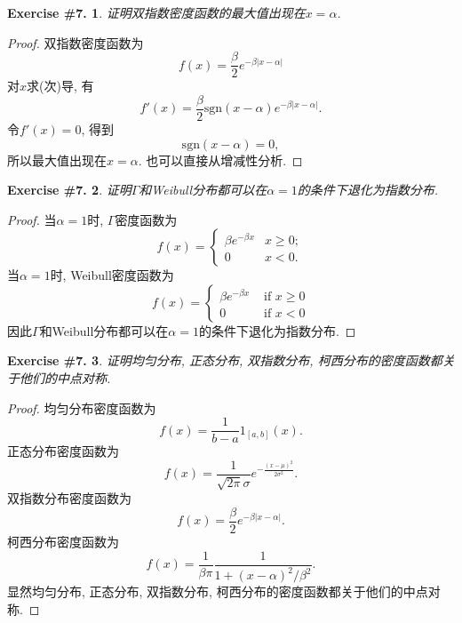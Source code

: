 \documentclass[UTF8, a4paper]{article}
\newtheorem{exercise}{Exercise \#7.}
\begin{document}
\begin{framed}
\begin{exercise}
证明双指数密度函数的最大值出现在$x = \alpha$.
\end{exercise}
\end{framed}

\begin{proof}
双指数密度函数为
$$
f(x)=\frac{\beta}{2} e^{-\beta|x-\alpha|}
$$
对\(x\)求(次)导, 有
$$
f'(x) = \frac{\beta}{2} \text{sgn}(x - \alpha)e^{-\beta|x-\alpha|}.
$$
令\(f'(x) = 0\), 得到
$$
\text{sgn}(x - \alpha) = 0,
$$
所以最大值出现在\(x = \alpha\). 也可以直接从增减性分析.

\end{proof}


\begin{framed}
\begin{exercise}
证明$\Gamma$和Weibull分布都可以在$\alpha = 1$的条件下退化为指数分布.
\end{exercise}
\end{framed}

\begin{proof}
当\(\alpha = 1\)时, \(\Gamma\)密度函数为
$$
f(x)= \begin{cases}\beta e^{-\beta x} & x \geq 0; \\ 0 & x<0.\end{cases}
$$
当\(\alpha = 1\)时, Weibull密度函数为
$$
f(x)= \begin{cases}\beta e^{-\beta x} & \text { if } x \geq 0 \\ 0 & \text { if } x<0\end{cases}
$$
因此\(\Gamma\)和Weibull分布都可以在\(\alpha = 1\)的条件下退化为指数分布.
\end{proof}


\begin{framed}
\begin{exercise}
证明均匀分布, 正态分布, 双指数分布, 柯西分布的密度函数都关于他们的中点对称.
\end{exercise}
\end{framed}

\begin{proof}
均匀分布密度函数为
$$
f(x)=\frac{1}{b-a} 1_{[a, b]}(x).
$$
正态分布密度函数为
$$
f(x) = \frac{1}{\sqrt{2\pi}\sigma}e^{-\frac{(x - \mu)^2}{2\sigma^2}}.
$$
双指数分布密度函数为
$$
f(x)=\frac{\beta}{2} e^{-\beta|x-\alpha|}.
$$
柯西分布密度函数为
$$
f(x)=\frac{1}{\beta\pi} \frac{1}{1+(x - \alpha)^2/\beta^2}.
$$
显然均匀分布, 正态分布, 双指数分布, 柯西分布的密度函数都关于他们的中点对称.
\end{proof}
\end{document}
